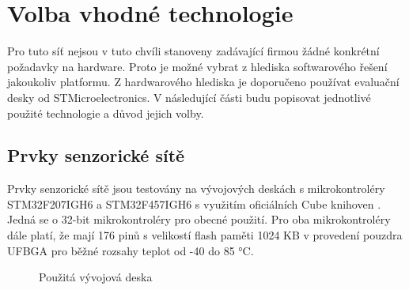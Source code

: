 \chapter{Volba vhodné technologie}
Pro tuto síť nejsou v tuto chvíli stanoveny zadávající firmou žádné konkrétní požadavky na hardware. Proto je možné vybrat z hlediska softwarového řešení jakoukoliv platformu. Z hardwarového hlediska je doporučeno používat evaluační desky od STMicroelectronics. V následující části budu popisovat jednotlivé použité technologie a důvod jejich volby.

\section{Prvky senzorické sítě}
Prvky senzorické sítě jsou testovány na vývojových deskách s mikrokontroléry STM32F207IGH6 a STM32F457IGH6 s využitím oficiálních Cube knihoven \cite{cube}. Jedná se o 32-bit mikrokontroléry pro obecné použití. Pro oba mikrokontroléry dále platí, že mají 176 pinů s velikostí flash paměti 1024 KB v provedení pouzdra UFBGA pro běžné rozsahy teplot od -40 do 85 °C.

\begin{figure}[h]
    \centering
	\caption{Použitá vývojová deska} %
	\label{fig:eval-board}
\end{figure}

